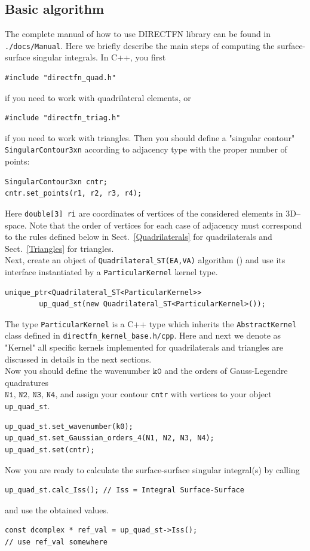 \documentclass[a4wide,11pt]{article}
\renewcommand{\[}{\begin{equation}}
\renewcommand{\]}{\end{equation}}
\renewcommand{\{}{\begin{eqnarray}}
\renewcommand{\}}{\end{eqnarray}}
\begin{document}
\subsection{Basic algorithm} 
\label{subs:libuse}
The complete manual of how to use DIRECTFN library can be found in \texttt{./docs/Manual}. Here we briefly describe the main steps of computing the surface-surface singular integrals. 
In C++, you first
\begin{verbatim}
#include "directfn_quad.h"
\end{verbatim}
 if you need to work with quadrilateral elements, or
\begin{verbatim}
#include "directfn_triag.h"
 \end{verbatim}
 if you need to work with triangles. Then you should define a "singular contour" \texttt{SingularContour3xn} according to adjacency type with the proper number of points:
\begin{verbatim}
SingularContour3xn cntr;
cntr.set_points(r1, r2, r3, r4);
\end{verbatim}
Here \texttt{double[3] ri} are coordinates of vertices of the considered elements in 3D--space.
 Note that the order of vertices for each case of adjacency must correspond to the rules defined below in  Sect.~\ref{Quadrilaterals} for quadrilaterals and Sect.~\ref{Triangles} for triangles. \\
 Next, create an object of \texttt{Quadrilateral$\_$ST(EA,VA)} algorithm () and use its interface instantiated by a \texttt{ParticularKernel} kernel type. 
\begin{verbatim}
unique_ptr<Quadrilateral_ST<ParticularKernel>> 
        up_quad_st(new Quadrilateral_ST<ParticularKernel>());
\end{verbatim}
The type \texttt{ParticularKernel}
is a C++ type which inherits the \texttt{AbstractKernel} class defined in \texttt{directfn\_kernel\_base.h/cpp}. Here and next we denote as "Kernel" all specific kernels implemented for quadrilaterals and triangles are discussed in details in the next sections.\\
Now you should define the wavenumber $\texttt{k0}$ and the orders of Gauss-Legendre quadratures\\ $\texttt{N1, N2, N3, N4}$, and assign your contour \texttt{cntr} with vertices to your object \texttt{up\_quad\_st}.
\begin{verbatim}
up_quad_st.set_wavenumber(k0);
up_quad_st.set_Gaussian_orders_4(N1, N2, N3, N4);
up_quad_st.set(cntr);
\end{verbatim}
Now you are ready to calculate the surface-surface singular integral(s) by calling
\begin{verbatim}
up_quad_st.calc_Iss(); // Iss = Integral Surface-Surface
\end{verbatim}
and use the obtained values.
\begin{verbatim}
const dcomplex * ref_val = up_quad_st->Iss();
// use ref_val somewhere
\end{verbatim}
\end{document}
